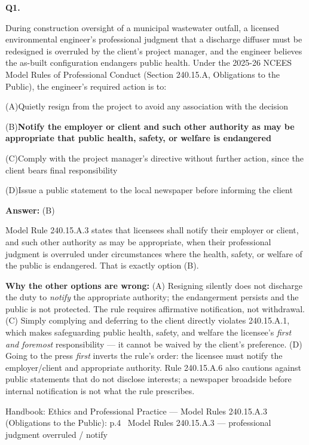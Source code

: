 \documentclass[11pt]{article}
\newcommand{\correct}[1]{\textbf{#1}\;{\color{accent}$\checkmark$}}
\newcommand{\optline}[2]{\par\noindent\hspace{1.2em}(#1)\hspace{0.6em}#2}
\begin{document}
\vspace{10pt}
\filbreak
\textbf{\color{accent}Q1.}\par\vspace{2pt}
During construction oversight of a municipal wastewater outfall, a licensed environmental engineer's professional judgment that a discharge diffuser must be redesigned is overruled by the client's project manager, and the engineer believes the as-built configuration endangers public health. Under the 2025-26 NCEES Model Rules of Professional Conduct (Section 240.15.A, Obligations to the Public), the engineer's required action is to:\par\par\vspace{3pt}
\optline{A}{Quietly resign from the project to avoid any association with the decision}
\optline{B}{\correct{Notify the employer or client and such other authority as may be appropriate that public health, safety, or welfare is endangered}}
\optline{C}{Comply with the project manager's directive without further action, since the client bears final responsibility}
\optline{D}{Issue a public statement to the local newspaper before informing the client}
\par\vspace{3pt}
\vspace{2pt}\par\noindent\colorbox{boxbg}{\parbox{\dimexpr\linewidth-2\fboxsep\relax}{%
\vspace{2pt}\textbf{Answer:} (B)\par\vspace{2pt}
{\small Model Rule 240.15.A.3 states that licensees shall notify their employer or client, and such other authority as may be appropriate, when their professional judgment is overruled under circumstances where the health, safety, or welfare of the public is endangered. That is exactly option (B).\par
\textbf{Why the other options are wrong:} (A) Resigning silently does not discharge the duty to \emph{notify} the appropriate authority; the endangerment persists and the public is not protected. The rule requires affirmative notification, not withdrawal. (C) Simply complying and deferring to the client directly violates 240.15.A.1, which makes safeguarding public health, safety, and welfare the licensee's \emph{first and foremost} responsibility --- it cannot be waived by the client's preference. (D) Going to the press \emph{first} inverts the rule's order: the licensee must notify the employer/client and appropriate authority. Rule 240.15.A.6 also cautions against public statements that do not disclose interests; a newspaper broadside before internal notification is not what the rule prescribes.\par}\par\vspace{2pt}
{\footnotesize\color{soft}Handbook: Ethics and Professional Practice --- Model Rules 240.15.A.3 (Obligations to the Public): p.4 \textbullet\ Model Rules 240.15.A.3 --- professional judgment overruled / notify}\vspace{2pt}
}}
\end{document}
